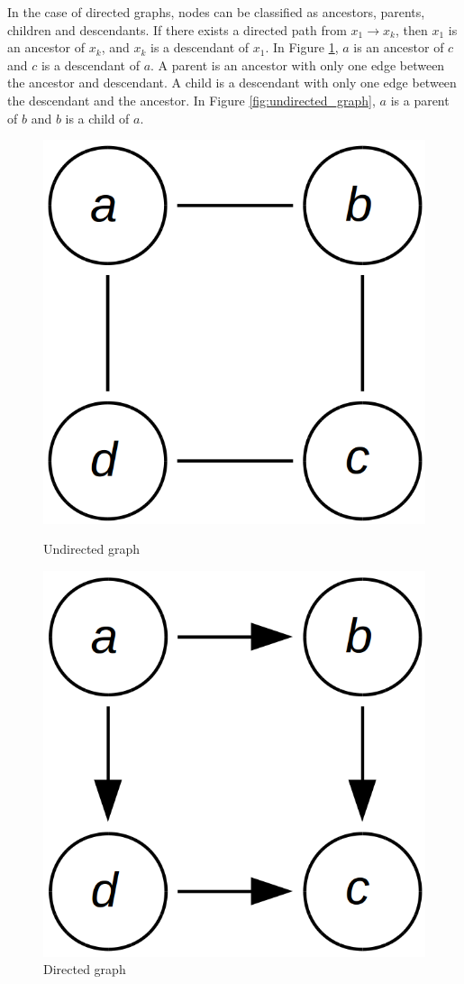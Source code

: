 \documentclass[12pt,oneside,openany,a4paper, %
afrikaans,english,
]{memoir}
\numberwithin{equation}{chapter}
\begin{document}
In the case of directed graphs, nodes can be classified as ancestors, parents, children and descendants. If there exists a directed path from $x_1 \to x_k$, then $x_1$ is an ancestor of $x_k$, and $x_k$ is a descendant of $x_1$. In Figure \ref{fig:directed_graph}, $a$ is an ancestor of $c$ and $c$ is a descendant of $a$. A parent is an ancestor with only one edge between the ancestor and descendant. A child is a descendant with only one edge between the descendant and the ancestor. In Figure \ref{fig:undirected_graph}, $a$ is a parent of $b$ and $b$ is a child of $a$.~\cite{barber}

\begin{figure}[htbp]
  \begin{minipage}[b]{0.5\linewidth}
    \centering
    \includegraphics[width=0.5\linewidth]{Figures/undirected_graph.png}
    \caption{Undirected graph}
    \label{fig:undirected_graph}
  \end{minipage}
  \hspace{0.5cm}
  \begin{minipage}[b]{0.5\linewidth}
    \centering
    \includegraphics[width=0.5\linewidth]{Figures/directed_graph.png}
    \caption{Directed graph}
    \label{fig:directed_graph}
  \end{minipage}
\end{figure}
\end{document}
